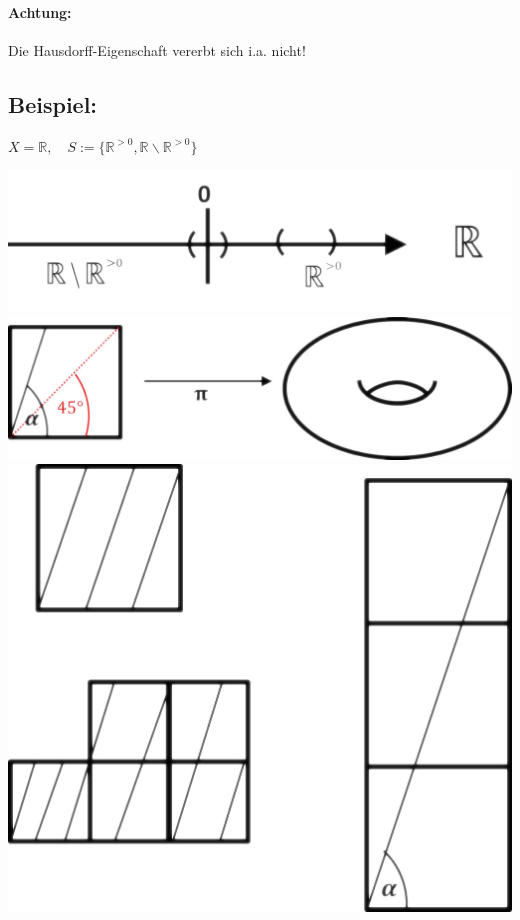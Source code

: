 \documentclass[a4paper,11pt,notitlepage]{report}
\theoremstyle{definition}
\newcommand{\R}{{\ensuremath{\mathbb{R}}}}
\newenvironment{bsp}[1]
{
\setlength{\fboxsep}{10pt}
\subsection*{Beispiel: #1}
\begin{upshape}
}
{
\end{upshape}
}
\begin{document}
\paragraph{Achtung:}
Die Hausdorff-Eigenschaft vererbt sich i.a. nicht!

\begin{bsp}{}
	$X = \R, \quad S:= \{\R^{>0}, \R \backslash \R^{>0}\}$\newline
	\begin{center}
		\includegraphics[scale=0.5]{images/Partition_R.png}\newline
		\includegraphics[scale=0.5]{images/Identifizierung_Linien.png}\newline
		\includegraphics[scale=0.5]{images/Linien_Quadrat.png}\newline
	\end{center}
	

\end{bsp}
\end{document}
